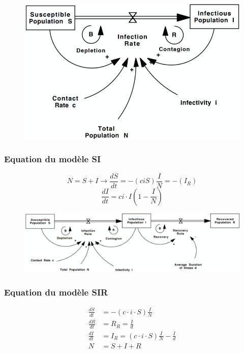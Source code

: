 \documentclass[resume]{subfiles}
\begin{document}
\begin{figure}[H]
    \centering
    \includegraphics[width=1\columnwidth]{Figures/SI_1.png}
\end{figure}

\subsubsection{Equation du modèle SI}
$$N=S+I \rightarrow \frac{dS}{dt}=-(ciS)\frac{I}{N}= -(I_R)$$
$$\frac{dI}{dt}=ci\cdot I(1-\frac{I}{N})$$

\begin{figure}[H]
    \centering
    \includegraphics[width=1\columnwidth]{Figures/SIR_1.png}
\end{figure}

\subsubsection{Equation du modèle SIR}

\begin{align*}
\frac{dS}{dt}&=-(c\cdot i\cdot S)\frac{I}{N}\\
\frac{dR}{dt}&=R_R =\frac{I}{d}\\
\frac{dI}{dt} &= I_R=(c\cdot i\cdot S)\frac{I}{N}-\frac{I}{d}\\
N&=S+I+R
\end{align*}
\end{document}
